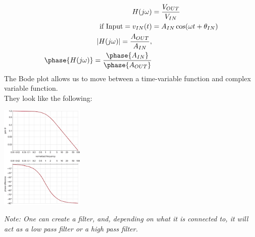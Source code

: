 \documentclass[nobib]{tufte-handout}
\begin{document}
\begin{align*}
    H(j\omega)                 & = \frac{V_{OUT}}{V_{IN}}           \\
    \text{if Input}= v_{IN}(t) & = A_{IN}\cos(\omega t+\theta_{IN}) \\
    |H(j\omega)| = \frac{A_{OUT}}{A_{IN}},                          \\
    \phase{H(j\omega)} = \frac{\phase{A_{IN}}}{\phase{A_{OUT}}}
\end{align*}
The Bode plot allows us to move between a time-variable function and complex variable function.\\
They look like the following:
\begin{center}
    \includegraphics[width = 150px]{images/bode_plot.png}
\end{center}
\textit{Note: One can create a filter, and, depending on what it is connected to, it will act as a low pass filter or a high pass filter.}\\
\end{document}
